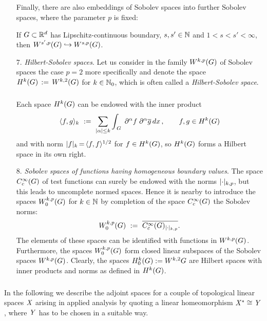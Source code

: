 \documentclass[11pt,twoside]{article}
\begin{document}
\begin{itemize}[leftmargin=15pt,itemsep=6pt]
\subparagraph*{} %
Finally,
there are also embeddings of Sobolev spaces into further Sobolev spaces,
where the parameter $p$ is fixed:

\begin{theorem}\label{SOBOLEV_EMBEDDING_THEOREM_III}
If $\G \subset \Rd$ has Lipschitz-continuous boundary,
$s,s' \in \N$ and $1 < s < s' < \infty$,
then $W^{s',p}(\G) \hookrightarrow W^{s,p}(\G)$.
\end{theorem}

\item[7.] \textit{Hilbert-Sobolev spaces}.
Let us consider in the family $W^{k,p}(G)$ of Sobolev spaces
the case $p{=}2$ more specifically and denote the space
$H^k(G) \,:=\, W^{k,2}(G)$ for $k \in {\mathbb{N}}_0$,
which is often called a \textit{Hilbert-Sobolev space}.

\subparagraph*{} %
Each space $H^k(G)$ can be endowed with the inner product
\[
\scalar{f}{g}_k \, \eqdef \,
\sum_{\abs{\alpha} \leq k} \int_{\,\G} \;
\PA f \; \PA \overline{g} \, dx\,,
\quad \quad f,g \in H^k(\G)
\]
and with norm
$\abs{f} _k \eq \scalar{f}{f}^{1/2}$ for $f \in H^k(G)$,
so $H^k(G)$ forms a Hilbert space in its own right.

\item[8.]
\textit{Sobolev spaces of functions having homogeneous boundary values}.
The space $C_c^{\infty}(G)$ of test functions can surely be endowed
with the norms $\abs{\cdot} _{k,p}$,
but this leads to uncomplete normed spaces.
Hence it is nearby to introduce the spaces $W_0^{k,p}(G)$ for $k \in {\mathbb{N}}$
by completion of the space $C_c^{\infty}(G)$ {\wrt} the Sobolev norms:
\[
\WN{k,p}{\G} \, \eqdef \, \overline{\TF_{\abs{\cdot} _{k,p}}}.
\]
The elements of these spaces can be identified with functions in $W^{k,p}(G)$.
Furthermore,
the spaces $W_0^{k,p}(G)$ form closed linear subspaces
of the Sobolev spaces $W^{k,p}(G)$.
Clearly,
the spaces $H_0^{k}(G) := W^{k,2}{G}$ are Hilbert spaces
with inner products and norms as defined in $H^k(G)$.
\end{itemize}

\subsubsection*{} %
In the following we describe the adjoint spaces
for a couple of topological linear spaces $\mathit{X}$ arising in applied analysis
by quoting a linear homeomorphism $\mathit{X}^* \cong \mathit{Y}$,
where $\mathit{Y}$ has to be chosen in a suitable way.
\end{document}
